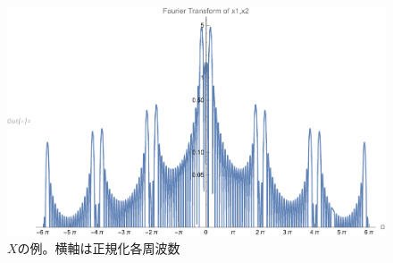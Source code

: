             \begin{figure}[H]
                \centering
                \includegraphics[keepaspectratio, scale=0.8]
                {parts/time-discretization/chapters/up-sampling/imgs/FT_of_x1.pdf}
                \caption{$X$の例。横軸は正規化各周波数}
            \end{figure}
